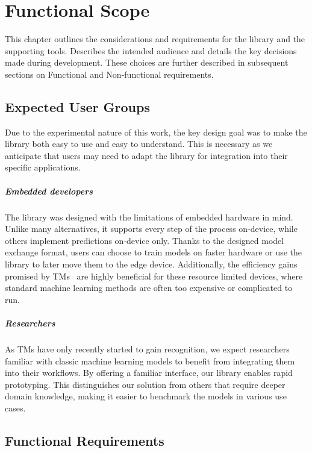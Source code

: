 \chapter{Functional Scope}
\label{chap:functional-scope}

This chapter outlines the considerations and requirements for the library and the supporting tools. Describes the intended audience and details the key decisions made during development. These choices are further described in subsequent sections on Functional and Non-functional requirements.

\section{Expected User Groups}
Due to the experimental nature of this work, the key design goal was to make the library both easy to use and easy to understand. This is necessary as we anticipate that users may need to adapt the library for integration into their specific applications.

\paragraph{Embedded developers}
The library was designed with the limitations of embedded hardware in mind. Unlike many alternatives, it supports every step of the process on-device, while others implement predictions on-device only. Thanks to the designed model exchange format, users can choose to train models on faster hardware or use the \GreenTsetlinName library to later move them to the edge device. Additionally, the efficiency gains promised by TMs~\cite{granmo2021tsetlinmachinegame} are highly beneficial for these resource limited devices, where standard machine learning methods are often too expensive or complicated to run.

\paragraph{Researchers}
As TMs have only recently started to gain recognition, we expect researchers familiar with classic machine learning models to benefit from integrating them into their workflows. By offering a familiar interface, our library enables rapid prototyping. This distinguishes our solution from others that require deeper domain knowledge, making it easier to benchmark the models in various use cases.

\section{Functional Requirements}

